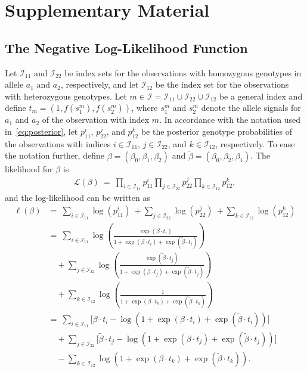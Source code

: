 \documentclass[preprint,5p,times,11pt]{elsarticle}
\begin{document}
\section*{Supplementary Material}

\subsection*{The Negative Log-Likelihood Function}
Let $\mathcal{I}_{11}$ and $\mathcal{I}_{22}$ be index sets for the observations with homozygous genotypes in allele $a_1$ and $a_2$, respectively, and let $\mathcal{I}_{12}$ be the index set for the observations with heterozygous genotypes.
Let $m \in \mathcal{I} = \mathcal{I}_{11}\cup\mathcal{I}_{22}\cup\mathcal{I}_{12}$ be a general index and define $t_m = (1, f(s_1^m), f(s_2^m))$, where $s_1^m$ and $s_2^m$ denote the allele signals for $a_1$ and $a_2$ of the observation with index $m$.
In accordance with the notation used in~\eqref{eq:posterior}, let $p_{11}^i$, $p_{22}^j$, and $p_{12}^k$ be the posterior genotype probabilities of the observations with indices $i \in \mathcal{I}_{11}$, $j \in \mathcal{I}_{22}$, and $k \in \mathcal{I}_{12}$, respectively.
To ease the notation further, define $\beta = (\beta_0,\beta_1,\beta_2)$ and $\tilde\beta = (\beta_0,\beta_2,\beta_1)$.
The likelihood for $\beta$ is
\begin{align*}
\mathcal{L}\left(\beta\right) \ = \ \prod_{i\in\mathcal{I}_{11}} p_{11}^i \prod_{j\in\mathcal{I}_{22}} p_{22}^j \prod_{k\in\mathcal{I}_{12}} p_{12}^k,
\end{align*}
and the log-likelihood can be written as
\begin{align*}
\ell\left(\beta\right)
&=\ \sum_{i\in\mathcal{I}_{11}} \log\left(p_{11}^i\right)
\ + \sum_{j\in\mathcal{I}_{22}} \log\left(p_{22}^j\right)
\ + \sum_{k\in\mathcal{I}_{12}} \log\left(p_{12}^k\right) \\
&= \ \sum_{i\in\mathcal{I}_{11}} \log\left(\frac{\exp\left(\beta \cdot t_i \right)}{1 + \exp\left(\beta \cdot t_i \right) + \exp\left(\tilde{\beta} \cdot t_i \right)}\right) \\
&\quad + \sum_{j\in\mathcal{I}_{22}} \log\left(\frac{\exp\left(\tilde{\beta} \cdot t_j \right)}{1 + \exp\left(\beta \cdot t_j \right) + \exp\left(\tilde{\beta} \cdot t_j \right)}\right) \\
&\quad + \sum_{k\in\mathcal{I}_{12}} \log\left(\frac{1}{1 + \exp\left(\beta \cdot t_k \right) + \exp\left(\tilde{\beta} \cdot t_k \right)}\right) \\
&= \ \sum_{i\in\mathcal{I}_{11}} \Bigg[ \beta \cdot t_i - \log\left(1 + \exp\left(\beta \cdot t_i \right) + \exp\left(\tilde{\beta} \cdot t_i \right)\right) \Bigg] \\
&\quad + \sum_{j\in\mathcal{I}_{22}} \Bigg[ \tilde{\beta} \cdot t_j - \log\left(1 + \exp\left(\beta \cdot t_j \right) + \exp\left(\tilde{\beta} \cdot t_j \right)\right) \Bigg] \\
&\quad - \sum_{k\in\mathcal{I}_{12}} \log\left(1 + \exp\left(\beta \cdot t_k \right) + \exp\left(\tilde{\beta} \cdot t_k \right)\right).
\end{align*}
\end{document}
